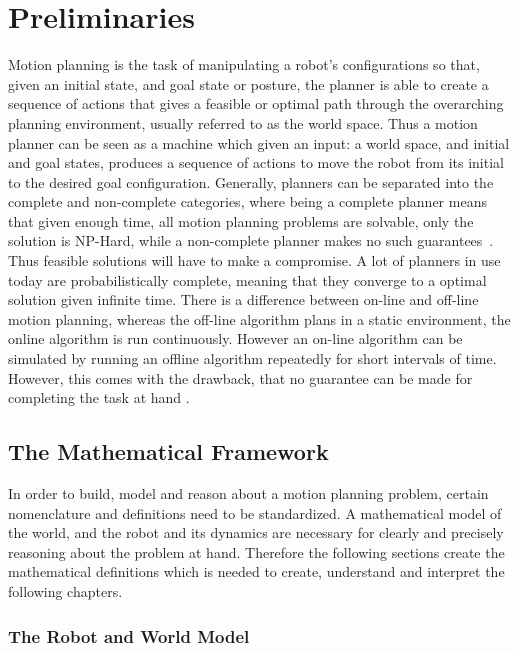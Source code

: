 \chapter{Preliminaries}
\label{chp:preliminaries}

Motion planning is the task of manipulating a robot's configurations so that,
given an initial state, and goal state or posture, the planner is able to create
a sequence of actions that gives a feasible or optimal path through the
overarching planning environment, usually referred to as the world space. Thus a
motion planner can be seen as a machine which given an input: a world space, and
initial and goal states, produces a sequence of actions to move the robot from
its initial to the desired goal configuration. Generally, planners can be
separated into the complete and non-complete categories, where being a complete
planner means that given enough time, all motion planning problems are solvable,
only the solution is NP-Hard, while a non-complete planner makes no such
guarantees~\cite{Lav06}. Thus feasible solutions will have to make a compromise.
A lot of planners in use today are probabilistically complete, meaning that they
converge to a optimal solution given infinite time. There is a difference
between on-line and off-line motion planning, whereas the off-line algorithm
plans in a static environment, the online algorithm is run continuously. However
an on-line algorithm can be simulated by running an offline algorithm repeatedly
for short intervals of time. However, this comes with the drawback, that no
guarantee can be made for completing the task at hand \cite{Lav06}.

\section{The Mathematical Framework}

In order to build, model and reason about a motion planning problem, certain
nomenclature and definitions need to be standardized. A mathematical model of
the world, and the robot and its dynamics are necessary for clearly and
precisely reasoning about the problem at hand. Therefore the following sections
create the mathematical definitions which is needed to create, understand and
interpret the following chapters.

\subsection{The Robot and World Model}

